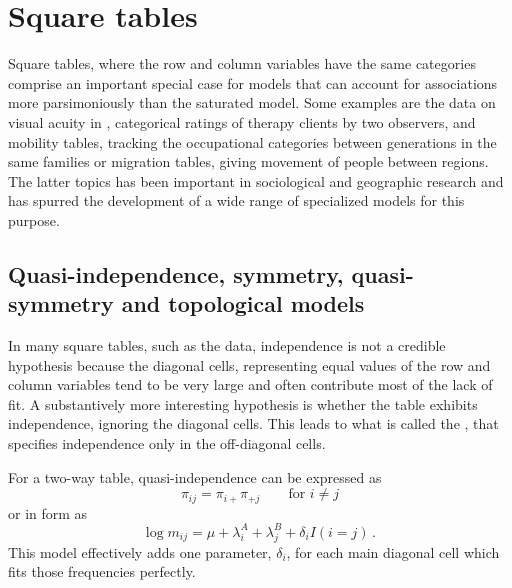 \documentclass[11pt]{book}\usepackage[]{graphicx}\usepackage[]{color}
\begin{document}
 
\section{Square tables}\label{sec:loglin-square}


Square tables, where the row and column variables have the same categories
comprise an important special case for \loglin models that can account
for associations more parsimoniously than the saturated model.
Some examples are the data on visual acuity in ,
categorical ratings of therapy clients by two observers,
and mobility tables, tracking the occupational categories
between generations in the same families or migration
tables, giving movement of people between regions.
The latter topics has been important in sociological and geographic
research
and has spurred the development of a wide range of specialized
\loglin models for this purpose.

\subsection{Quasi-independence, symmetry, quasi-symmetry and topological models}\label{sec:sq-quasi}

In many square tables, such as the  data, independence is
not a credible hypothesis because the diagonal cells, representing
equal values of the row and column variables tend to be very large
and often contribute most of the lack of fit.
A substantively more interesting hypothesis is whether the table
exhibits independence, ignoring the diagonal cells. This
leads to what is called the ,
that specifies independence only in the off-diagonal cells.

For a two-way table, quasi-independence can be expressed as
\begin{equation*}
 \pi_{ij} = \pi_{i+} \pi_{+j} \quad\quad \mbox{for } i\ne j
\end{equation*}
or in \loglin form as
\begin{equation*}
 \log m_{ij} = \mu + \lambda_i^A + \lambda_j^B + \delta_i I(i=j)
 \period
\end{equation*}
This model effectively adds one parameter, $\delta_i$, for each main diagonal cell
which fits those frequencies perfectly.
\end{document}
